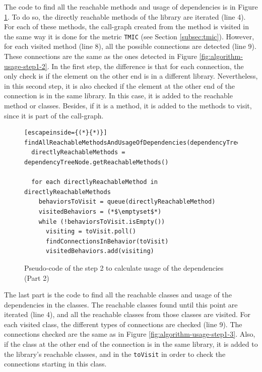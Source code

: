 The code to find all the reachable methods and usage of dependencies is in Figure \ref{fig:algorithm-usage-step2-2}. To do so, the directly reachable methods of the library are iterated (line 4). For each of these methods, the call-graph created from the method is visited in the same way it is done for the metric \texttt{TMIC} (see Section \ref{subsec:tmic}). However, for each visited method (line 8), all the possible connections are detected (line 9). These connections are the same as the ones detected in Figure \ref{fig:algorithm-usage-step1-2}. In the first step, the difference is that for each connection, the only check is if the element on the other end is in a different library. Nevertheless, in this second step, it is also checked if the element at the other end of the connection is in the same library. In this case, it is added to the reachable method or classes. Besides, if it is a method, it is added to the methods to visit, since it is part of the call-graph.

\begin{figure}[ht!]
\begin{lstlisting}[escapeinside={(*}{*)}]
findAllReachableMethodsAndUsageOfDependencies(dependencyTreeNode)
  directlyReachableMethods = dependencyTreeNode.getReachableMethods()

  for each directlyReachableMethod in directlyReachableMethods
    behaviorsToVisit = queue(directlyReachableMethod)
    visitedBehaviors = (*$\emptyset$*)
    while (!behaviorsToVisit.isEmpty())
      visiting = toVisit.poll()
      findConnectionsInBehavior(toVisit)
      visitedBehaviors.add(visiting)
\end{lstlisting}
\caption{Pseudo-code of the step 2 to calculate usage of the dependencies (Part 2)}
\label{fig:algorithm-usage-step2-2}
\end{figure}

The last part is the code to find all the reachable classes and usage of the dependencies in the classes. The reachable classes found until this point are iterated (line 4), and all the reachable classes from those classes are visited. For each visited class, the different types of connections are checked (line 9). The connections checked are the same as in Figure \ref{fig:algorithm-usage-step1-3}. Also, if the class at the other end of the connection is in the same library, it is added to the library's reachable classes, and in the \texttt{toVisit} in order to check the connections starting in this class.

